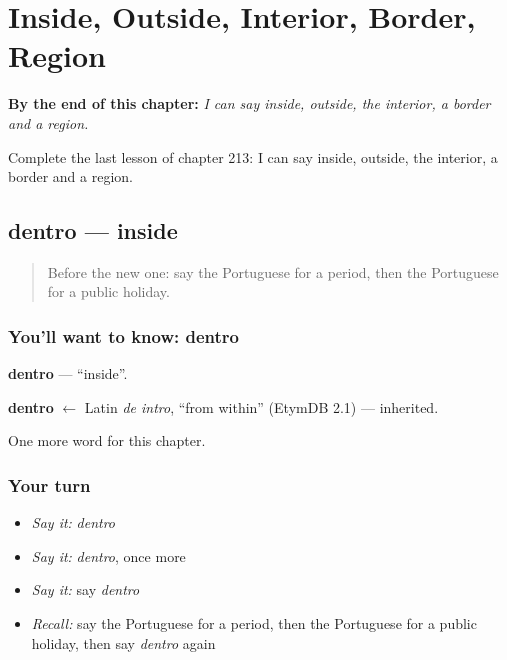 
\chapter{Inside, Outside, Interior, Border, Region}
\label{ch:pt-inside-outside-interior-border-region}

\begin{chapteropening}
\textbf{By the end of this chapter:} \emph{I can say inside, outside, the interior, a border and a region.}

Complete the last lesson of chapter 213: I can say inside, outside, the interior, a border and a region.
\end{chapteropening}

\section[dentro]{dentro — inside}

\label{lesson:PT-C213-dentro}



\begin{quote}
Before the new one: say the Portuguese for a period, then the Portuguese for a public holiday.
\end{quote}

\subsection*{You'll want to know: dentro}
\textbf{dentro} — \textquotedblleft{}inside\textquotedblright{}.

\begin{cousinweb}
\textbf{dentro} $\leftarrow$ Latin \emph{de intro}, \textquotedblleft{}from within\textquotedblright{} (EtymDB 2.1) — inherited.
\end{cousinweb}

\begin{grammarlens}[title={What you've built}]
One more word for this chapter.
\end{grammarlens}

\subsection*{Your turn}
\begin{itemize}
\raggedright
  \item \emph{Say it:} \emph{dentro}
  \item \emph{Say it:} \emph{dentro}, once more
  \item \emph{Say it:} say \emph{dentro}
  \item \emph{Recall:} say the Portuguese for a period, then the Portuguese for a public holiday, then say \emph{dentro} again
\end{itemize}

